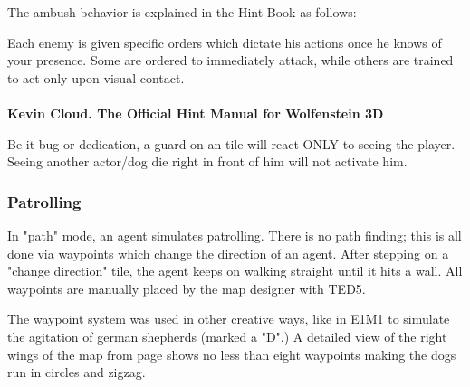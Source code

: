 \par

 The ambush behavior is explained in the Hint Book as follows:\\
\par
\begin{fancyquotes}
Each enemy is given specific orders which dictate his actions once he knows of your presence. Some are ordered to immediately attack, while others are trained to act only upon visual contact.
 \bigskip \\
\bigskip \\
\textbf{Kevin Cloud. The Official Hint Manual for Wolfenstein 3D}
 \end{fancyquotes}
\par
{} Be it bug or dedication, a guard on an  tile will react ONLY to seeing the player. Seeing another actor/dog die right in front of him will not activate him.\\


\subsubsection{Patrolling}
In "path" mode, an agent simulates patrolling. There is no path finding; this is all done via waypoints which change the direction of an agent. After stepping on a "change direction" tile, the agent keeps on walking straight until it hits a wall. All waypoints are manually placed by the map designer with TED5.\\ 
\par
The waypoint system was used in other creative ways, like in E1M1 to simulate the agitation of german shepherds (marked a "D".) A detailed view of the right wings of the map from page \pageref{mape1m1} shows no less than eight waypoints making the dogs run in circles and zigzag.\\
\par
\begin{figure}[H]
 \centering
\end{figure}
\par







